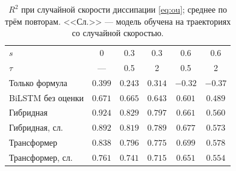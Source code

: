 \documentclass[12pt,a4paper]{report}
\numberwithin{equation}{chapter}
\begin{document}
\begin{table}[h]
\centering
\caption{$R^2$ при случайной скорости диссипации \eqref{eq:ou}; среднее по
трём повторам. <<Сл.>> --- модель обучена на траекториях со случайной
скоростью.}
\label{tab:r21}
\small
\begin{tabular}{@{}lccccc@{}}
\toprule
$s$ & 0 & 0.3 & 0.3 & 0.6 & 0.6 \\
$\tau$ & --- & 0.5 & 2 & 0.5 & 2 \\
\midrule
Только формула & $0.399$ & $0.243$ & $0.314$ & $-0.32$ & $-0.37$ \\
BiLSTM без оценки & $0.671$ & $0.665$ & $0.643$ & $0.601$ & $0.489$ \\
Гибридная & $\mathbf{0.924}$ & $\mathbf{0.829}$ & $\mathbf{0.797}$ & $0.661$ & $0.560$ \\
Гибридная, сл. & $0.892$ & $0.819$ & $0.789$ & $0.677$ & $0.573$ \\
Трансформер & $0.838$ & $0.796$ & $0.775$ & $\mathbf{0.699}$ & $\mathbf{0.578}$ \\
Трансформер, сл. & $0.761$ & $0.741$ & $0.715$ & $0.651$ & $0.554$ \\
\bottomrule
\end{tabular}
\end{table}
\end{document}
